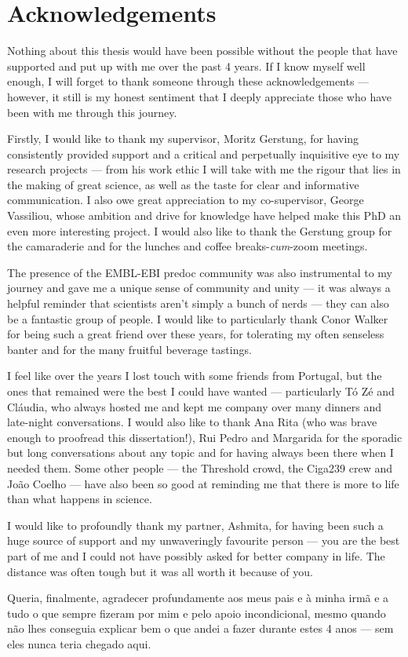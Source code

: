 \chapter{Acknowledgements}

Nothing about this thesis would have been possible without the people that have supported and put up with me over the past 4 years. If I know myself well enough, I will forget to thank someone through these acknowledgements --- however, it still is my honest sentiment that I deeply appreciate those who have been with me through this journey.

Firstly, I would like to thank my supervisor, Moritz Gerstung, for having consistently provided support and a critical and perpetually inquisitive eye to my research projects --- from his work ethic I will take with me the rigour that lies in the making of great science, as well as the taste for clear and informative communication. I also owe great appreciation to my co-supervisor, George Vassiliou, whose ambition and drive for knowledge have helped make this PhD an even more interesting project. I would also like to thank the Gerstung group for the camaraderie and for the lunches and coffee breaks-\textit{cum}-zoom meetings.

The presence of the EMBL-EBI predoc community was also instrumental to my journey and gave me a unique sense of community and unity --- it was always a helpful reminder that scientists aren't simply a bunch of nerds --- they can also be a fantastic group of people. I would like to particularly thank Conor Walker for being such a great friend over these years, for tolerating my often senseless banter and for the many fruitful beverage tastings. 

I feel like over the years I lost touch with some friends from Portugal, but the ones that remained were the best I could have wanted --- particularly Tó Zé and Cláudia, who always hosted me and kept me company over many dinners and late-night conversations. I would also like to thank Ana Rita (who was brave enough to proofread this dissertation!), Rui Pedro and Margarida for the sporadic but long conversations about any topic and for having always been there when I needed them. Some other people --- the Threshold crowd, the Ciga239 crew and João Coelho --- have also been so good at reminding me that there is more to life than what happens in science. 

I would like to profoundly thank my partner, Ashmita, for having been such a huge source of support and my unwaveringly favourite person --- you are the best part of me and I could not have possibly asked for better company in life. The distance was often tough but it was all worth it because of you.

Queria, finalmente, agradecer profundamente aos meus pais e à minha irmã e a tudo o que sempre fizeram por mim e pelo apoio incondicional, mesmo quando não lhes conseguia explicar bem o que andei a fazer durante estes 4 anos --- sem eles nunca teria chegado aqui.